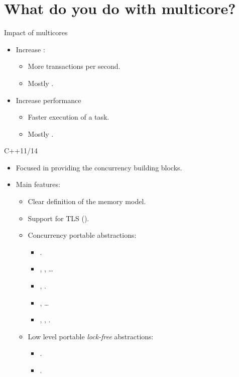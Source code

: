 \section{What do you do with multicore?}

\begin{frame}[t]{Impact of multicores}
\begin{itemize}
\item Increase :
  \begin{itemize}
    \item More transactions per second.
    \item Mostly .
  \end{itemize}

\item Increase performance
  \begin{itemize}
    \item Faster execution of a task.
    \item Mostly .
  \end{itemize}
\end{itemize}
\end{frame}

\begin{frame}[t]{C++11/14}
\begin{itemize}
  \item Focused in providing the concurrency building blocks.
  \item Main features:
    \begin{itemize}
      \item Clear definition of the memory model.
      \item Support for TLS ().
      \item Concurrency portable abstractions:
        \begin{itemize}
          \item {}.
          \item {}, , \ldots
          \item {}, .
          \item {}, \ldots
          \item {}, , .
        \end{itemize}
      \item Low level portable \emph{lock-free} abstractions:
        \begin{itemize}
          \item {}.
          \item {}.
        \end{itemize}
    \end{itemize}
\end{itemize}
\end{frame}
